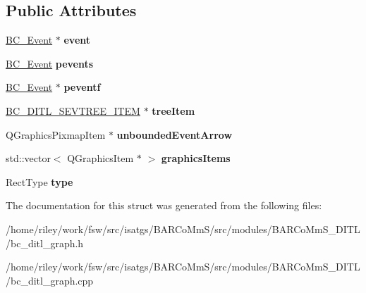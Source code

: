 \subsection*{Public Attributes}
\begin{DoxyCompactItemize}
\item 
\hyperlink{class_b_c___event}{B\+C\+\_\+\+Event} $\ast$ {\bfseries event}\hypertarget{struct_graph_1_1_event_item_a1fe7fac5bfe82471c0f99b27685cdca2}{}\label{struct_graph_1_1_event_item_a1fe7fac5bfe82471c0f99b27685cdca2}

\item 
\hyperlink{class_b_c___event}{B\+C\+\_\+\+Event} {\bfseries pevents}\hypertarget{struct_graph_1_1_event_item_ae23ec75f6d3edd58d5ff121f463abbb3}{}\label{struct_graph_1_1_event_item_ae23ec75f6d3edd58d5ff121f463abbb3}

\item 
\hyperlink{class_b_c___event}{B\+C\+\_\+\+Event} $\ast$ {\bfseries peventf}\hypertarget{struct_graph_1_1_event_item_ad553ac00e7fb52be7c183a92c64c26bc}{}\label{struct_graph_1_1_event_item_ad553ac00e7fb52be7c183a92c64c26bc}

\item 
\hyperlink{class_b_c___d_i_t_l___s_e_v_t_r_e_e___i_t_e_m}{B\+C\+\_\+\+D\+I\+T\+L\+\_\+\+S\+E\+V\+T\+R\+E\+E\+\_\+\+I\+T\+EM} $\ast$ {\bfseries tree\+Item}\hypertarget{struct_graph_1_1_event_item_a8fd8ea204630af864ef6465b230f0806}{}\label{struct_graph_1_1_event_item_a8fd8ea204630af864ef6465b230f0806}

\item 
Q\+Graphics\+Pixmap\+Item $\ast$ {\bfseries unbounded\+Event\+Arrow}\hypertarget{struct_graph_1_1_event_item_afbde0eb07aef4413e1ec45f1b2d2946a}{}\label{struct_graph_1_1_event_item_afbde0eb07aef4413e1ec45f1b2d2946a}

\item 
std\+::vector$<$ Q\+Graphics\+Item $\ast$ $>$ {\bfseries graphics\+Items}\hypertarget{struct_graph_1_1_event_item_a3c44521bc6bed06d14c03239e357a63b}{}\label{struct_graph_1_1_event_item_a3c44521bc6bed06d14c03239e357a63b}

\item 
Rect\+Type {\bfseries type}\hypertarget{struct_graph_1_1_event_item_a3bd60dae1aa172849bb2e293fc05bbde}{}\label{struct_graph_1_1_event_item_a3bd60dae1aa172849bb2e293fc05bbde}

\end{DoxyCompactItemize}


The documentation for this struct was generated from the following files\+:\begin{DoxyCompactItemize}
\item 
/home/riley/work/fsw/src/isatgs/\+B\+A\+R\+Co\+Mm\+S/src/modules/\+B\+A\+R\+Co\+Mm\+S\+\_\+\+D\+I\+T\+L/bc\+\_\+ditl\+\_\+graph.\+h\item 
/home/riley/work/fsw/src/isatgs/\+B\+A\+R\+Co\+Mm\+S/src/modules/\+B\+A\+R\+Co\+Mm\+S\+\_\+\+D\+I\+T\+L/bc\+\_\+ditl\+\_\+graph.\+cpp\end{DoxyCompactItemize}
